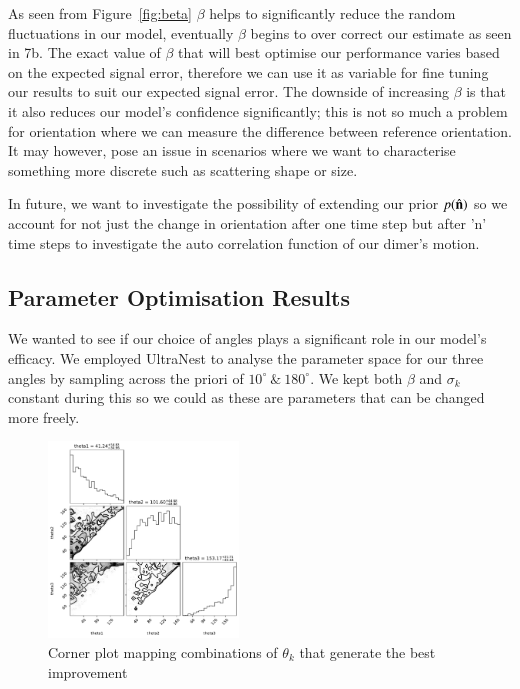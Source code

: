 \documentclass[final,  3p]{elsarticle}
\begin{document}
As seen from Figure~\ref{fig:beta} $\beta$ helps to significantly reduce the random fluctuations in our model, eventually $\beta$ begins to over correct our estimate as seen in 7b. The exact value of $\beta$ that will best optimise our performance varies based on the expected signal error, therefore we can use it as variable for fine tuning our results to suit our expected signal error. The downside of increasing $\beta$ is that it also reduces our model's confidence significantly; this is not so much a problem for orientation where we can measure the difference between reference orientation. It may however, pose an issue in scenarios where we want to characterise something more discrete such as scattering shape or size. 

In future, we want to investigate the possibility of extending our prior $p(\hat{\bf n})$ so we account for not just the change in orientation after one time step but after 'n' time steps to investigate the auto correlation function of our dimer's motion.

\subsection{Parameter Optimisation Results}
\label{sec:ultranest_res}

We wanted to see if our choice of angles plays a significant role in our model's efficacy. We employed UltraNest to analyse the parameter space for our three angles by sampling across the priori of $10^{\circ} \ \& \ 180^{\circ}$.  We kept both $\beta$ and $\sigma_k$ constant during this so we could as these are parameters that can be changed more freely.

\begin{figure}[h]
	\centering
	\includegraphics[width=0.45\textwidth]{./Images/fig8.png}
	\caption{Corner plot mapping combinations of $\theta_k$ that generate the best improvement}
	\label{fig:corner}
\end{figure}
\end{document}
